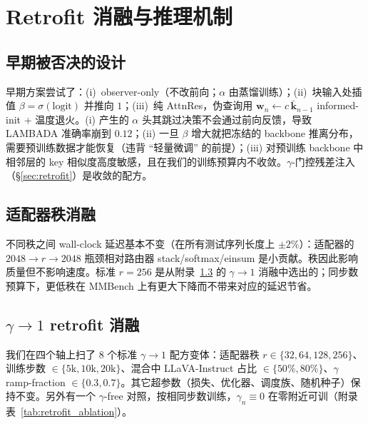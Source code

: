 \documentclass{article}
\begin{document}
\section{Retrofit 消融与推理机制}
\label{app:ablations}

\subsection{早期被否决的设计}
\label{app:route_ablations}
早期方案尝试了：(i)~observer-only（不改前向；$\alpha$ 由蒸馏训练）；(ii)~块输入处插值 $\beta{=}\sigma(\text{logit})$ 并推向 $1$；(iii)~纯 AttnRes，伪查询用 $\mathbf{w}_n \gets c\,\bar{\mathbf{k}}_{n-1}$ informed-init + 温度退火。(i) 产生的 $\alpha$ 头其跳过决策不会通过前向反馈，导致 LAMBADA 准确率崩到 $0.12$；(ii) 一旦 $\beta$ 增大就把冻结的 backbone 推离分布，需要预训练数据才能恢复（违背 ``轻量微调'' 的前提）；(iii) 对预训练 backbone 中相邻层的 key 相似度高度敏感，且在我们的训练预算内不收敛。$\gamma$-门控残差注入（\S\ref{sec:retrofit}）是收敛的配方。

\subsection{适配器秩消融}
\label{app:rank_ablation}
不同秩之间 wall-clock 延迟基本不变（在所有测试序列长度上 $\pm 2\%$）：适配器的 $2048{\to}r{\to}2048$ 瓶颈相对路由器 stack/softmax/einsum 是小贡献。秩因此影响质量但不影响速度。标准 $r{=}256$ 是从附录~\ref{app:retrofit_ablation} 的 $\gamma{\to}1$ 消融中选出的；同步数预算下，更低秩在 MMBench 上有更大下降而不带来对应的延迟节省。

\subsection{\texorpdfstring{$\gamma{\to}1$ retrofit 消融}{gamma-to-1 retrofit ablation}}
\label{app:retrofit_ablation}
我们在四个轴上扫了 $8$ 个标准 $\gamma{\to}1$ 配方变体：适配器秩 $r\in\{32,64,128,256\}$、训练步数 $\in\{5\text{k},10\text{k},20\text{k}\}$、混合中 LLaVA-Instruct 占比 $\in\{50\%,80\%\}$、$\gamma$ ramp-fraction $\in\{0.3,0.7\}$。其它超参数（损失、优化器、调度族、随机种子）保持不变。另外有一个 $\gamma$-free 对照，按相同步数训练，$\gamma_n\equiv 0$ 在零附近可训（附录表~\ref{tab:retrofit_ablation}）。
\end{document}
